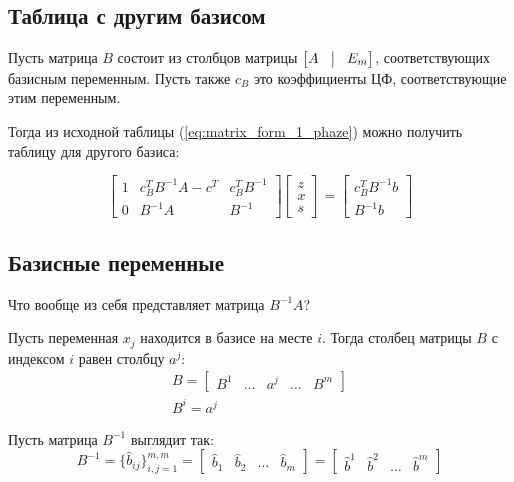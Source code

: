 \documentclass[a4paper,article,14pt]{extarticle}
\begin{document}
\subsection{Таблица с другим базисом}

Пусть матрица \(B\) состоит из столбцов матрицы \(
    \begin{bmatrix}
        A & \vline & E_m
    \end{bmatrix}
\), соответствующих базисным переменным.
Пусть также \(c_B\) это коэффициенты ЦФ, соответствующие этим переменным.

Тогда из исходной таблицы (\ref{eq:matrix_form_1_phaze}) можно получить таблицу для другого базиса:

\begin{equation} \label{eq:matrix_form_1_phaze_basis}
    \begin{bmatrix}
        1 & c_B^TB^{-1}A-c^T & c_B^TB^{-1} \\
        0 & B^{-1}A & B^{-1}
    \end{bmatrix}
    \begin{bmatrix}
        z \\ x \\ s
    \end{bmatrix}
    =
    \begin{bmatrix}
        c_B^TB^{-1}b \\ B^{-1}b
    \end{bmatrix}
\end{equation}

\subsection{Базисные переменные}

Что вообще из себя представляет матрица \(B^{-1}A\)?

Пусть переменная \(x_j\) находится в базисе на месте \(i\).
Тогда столбец матрицы \(B\) с индексом \(i\) равен столбцу \(a^j\):
\begin{equation}
    \begin{gathered}
        B = \begin{bmatrix}
            B^1 & \ldots & a^j & \ldots & B^m
        \end{bmatrix} \\
        B^i = a^j
    \end{gathered}
\end{equation}

Пусть матрица \(B^{-1}\) выглядит так:
\begin{equation}
    B^{-1} =
    \{\hat b_{ij}\}_{i,j=1}^{m,m}
    =
    \begin{bmatrix}
        \hat b_1 &
        \hat b_2 &
        \ldots &
        \hat b_m
    \end{bmatrix}
    =
    \begin{bmatrix}
        \hat b^1 &
        \hat b^2 &
        \ldots &
        \hat b^m
    \end{bmatrix}
\end{equation}
\end{document}

